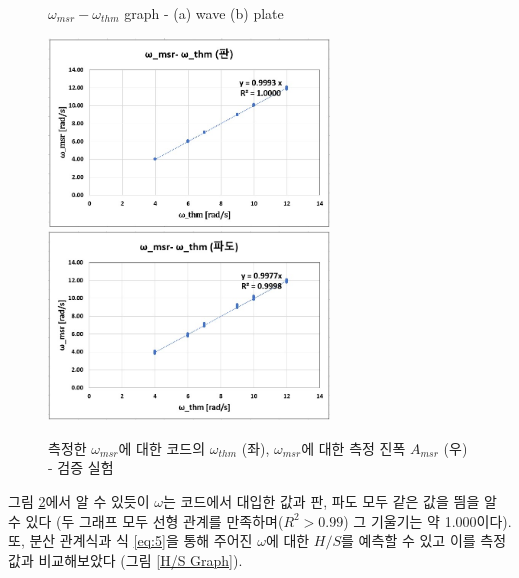 \begin{figure}[H]
    \caption{$\omega_{msr} - \omega_{thm}$ graph - (a) wave (b) plate}
    \label{PreExperiment}
\end{figure}





\begin{figure}[H]
    \centering
    \includegraphics[height=5cm]{images/Experiment(omega_thm-omega_msr)_Plate_Kor.jpg}
    \includegraphics[height=5cm]{images/Experiment(omega_thm-omega_msr)_Wave_Kor.jpg}
    \caption{측정한 $\omega_{msr}$에 대한 코드의 $\omega_{thm}$ (좌),  $\omega_{msr}$에 대한 측정 진폭 $A_{msr}$ (우) - 검증 실험}
    \label{ExperimentGraph - 1, 2}
\end{figure}

그림 \ref{ExperimentGraph - 1, 2}에서 알 수 있듯이 $\omega$는 코드에서 대입한 값과 판, 파도 모두 같은 값을 띔을 알 수 있다 (두 그래프 모두 선형 관계를 만족하며($R^2 > 0.99$) 그 기울기는 약 1.000이다). 또, 분산 관계식과 식 \ref{eq:5}을 통해 주어진 $\omega$에 대한 $H/S$를 예측할 수 있고 이를 측정값과 비교해보았다 (그림 \ref{H/S Graph}).

